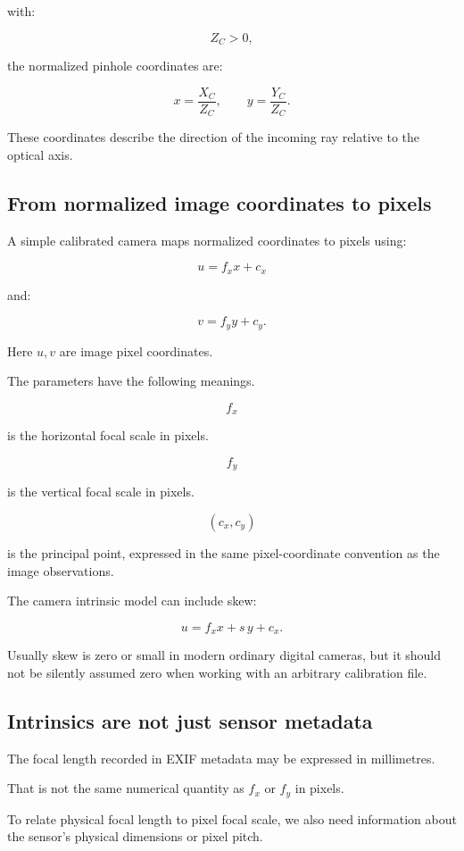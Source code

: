 with:

\[
 Z_C>0,
\]

the normalized pinhole coordinates are:

\[
 \boxed{ x=\frac{X_C}{Z_C}, \qquad y=\frac{Y_C}{Z_C} }.
\]

These coordinates describe the direction of the incoming ray relative to the optical axis.

\subsection{From normalized image coordinates to pixels}\label{02-foundations-ii-ch034-from-normalized-image-coordinates-to-pixels}

A simple calibrated camera maps normalized coordinates to pixels using:

\[
 \boxed{ u=f_xx+c_x }
\]

and:

\[
 \boxed{ v=f_yy+c_y }.
\]

Here \(u,v\) are image pixel coordinates.

The parameters have the following meanings.

\[
 f_x
\]

is the horizontal focal scale in pixels.

\[
 f_y
\]

is the vertical focal scale in pixels.

\[
 (c_x,c_y)
\]

is the principal point, expressed in the same pixel-coordinate convention as the image observations.

The camera intrinsic model can include skew:

\[
 \boxed{ u=f_xx+s\,y+c_x }.
\]

Usually skew is zero or small in modern ordinary digital cameras, but it should not be silently assumed zero when working with an arbitrary calibration file.

\subsection{Intrinsics are not just sensor metadata}\label{02-foundations-ii-ch034-intrinsics-are-not-just-sensor-metadata}

The focal length recorded in EXIF metadata may be expressed in millimetres.

That is not the same numerical quantity as \(f_x\) or \(f_y\) in pixels.

To relate physical focal length to pixel focal scale, we also need information about the sensor's physical dimensions or pixel pitch.

